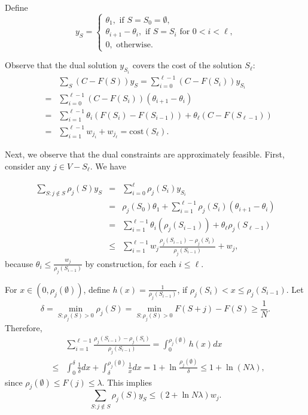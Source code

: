 Define
\[
y_S =
\begin{cases}
\theta_1, \mbox{ if $S=S_0=\emptyset$,}\\
\theta_{i+1} - \theta_i, \mbox{ if $S=S_i$ for $0<i<\ell$,}\\
0, \mbox{ otherwise.}
\end{cases}
\]

Observe that the dual solution $y_{S_i}$ covers the cost of the solution $S_{\ell}$:
\begin{eqnarray*}
&&\sum_S (C-F(S))y_S = \sum_{i=0}^{\ell-1} (C-F(S_i))y_{S_i}\\
&=& \sum_{i=0}^{\ell-1} (C-F(S_i))(\theta_{i+1}-\theta_i)\\
&=& \sum_{i=1}^{\ell-1}\theta_i(F(S_{i}) - F(S_{i-1})) + \theta_{\ell}(C-F(S_{\ell-1})) \\
&=& \sum_{i=1}^{\ell-1} w_{j_i} + w_{j_{\ell}} = \text{cost}(S_{\ell}).
\end{eqnarray*}

Next, we observe that the dual constraints are approximately feasible. First, consider any
$j\in V - S_{\ell}$. We have

\begin{eqnarray*}
\sum_{S: j\not\in S} \rho_j(S)y_S &=& \sum_{i=0}^{\ell} \rho_j(S_i) y_{S_i} \\
&=& \rho_j(S_0)\theta_1 + \sum_{i=1}^{\ell-1} \rho_j(S_i)(\theta_{i+1}-\theta_i)\\
&=& \sum_{i=1}^{\ell-1} \theta_i(\rho_j(S_{i-1})) + \theta_{\ell}\rho_j(S_{\ell-1}) \\
&\leq& \sum_{i=1}^{\ell-1} w_j \frac{\rho_j(S_{i-1}) - \rho_j(S_i)}{\rho_j(S_{i-1})} + w_j,
\end{eqnarray*}
because $\theta_i\leq \frac{w_j}{\rho_j(S_{i-1})}$ by construction, for each $i\leq\ell$.

For $x\in(0, \rho_j(\emptyset))$, define
$h(x) = \frac{1}{\rho_j(S_{i-1})}$, if $\rho_j(S_i) < x \leq \rho_j(S_{i-1})$. Let
\[
\delta = \min_{S: \rho_j(S)>0} \rho_j(S) = \min_{S:\rho_j(S)>0} F(S+j) - F(S) \geq \frac{1}{N}.
\]
%
Therefore,
\begin{eqnarray*}
&&\sum_{i=1}^{\ell-1} \frac{\rho_j(S_{i-1}) - \rho_j(S_i)}{\rho_j(S_{i-1})} = \int_0^{\rho_j(\emptyset)} h(x) dx \\
&\leq& \int_0^{\delta}\frac{1}{\delta} dx + \int_{\delta}^{\rho_j(\emptyset)} \frac{1}{x} dx
= 1 + \ln \frac{\rho_j(\emptyset)}{\delta}
\leq 1 + \ln (N\lambda),
\end{eqnarray*}
since $\rho_j(\emptyset)\leq F(j) \leq \lambda$.
This implies
\[
\sum_{S: j\not\in S}\rho_j(S) y_S \leq (2+\ln{N\lambda}) w_j.
\]

